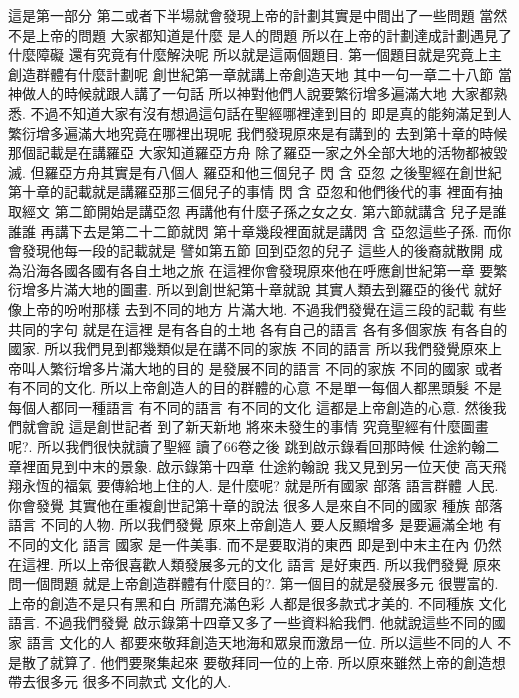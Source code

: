 \documentclass{book}
\begin{document}
這是第一部分 第二或者下半場就會發現上帝的計劃其實是中間出了一些問題 當然不是上帝的問題 大家都知道是什麼 是人的問題 所以在上帝的計劃達成計劃遇見了什麼障礙 還有究竟有什麼解決呢 所以就是這兩個題目.
第一個題目就是究竟上主創造群體有什麼計劃呢 創世紀第一章就講上帝創造天地 其中一句一章二十八節 當神做人的時候就跟人講了一句話 所以神對他們人說要繁衍增多遍滿大地 大家都熟悉.
不過不知道大家有沒有想過這句話在聖經哪裡達到目的 即是真的能夠滿足到人繁衍增多遍滿大地究竟在哪裡出現呢 我們發現原來是有講到的 去到第十章的時候那個記載是在講羅亞 大家知道羅亞方舟 除了羅亞一家之外全部大地的活物都被毀滅.
但羅亞方舟其實是有八個人 羅亞和他三個兒子 閃 含 亞忽 之後聖經在創世紀第十章的記載就是講羅亞那三個兒子的事情 閃 含 亞忽和他們後代的事 裡面有抽取經文 第二節開始是講亞忽 再講他有什麼子孫之女之女.
第六節就講含 兒子是誰誰誰 再講下去是第二十二節就閃 第十章幾段裡面就是講閃 含 亞忽這些子孫.
而你會發現他每一段的記載就是 譬如第五節 回到亞忽的兒子 這些人的後裔就散開 成為沿海各國各國有各自土地之旅 在這裡你會發現原來他在呼應創世紀第一章 要繁衍增多片滿大地的圖畫.
所以到創世紀第十章就說 其實人類去到羅亞的後代 就好像上帝的吩咐那樣 去到不同的地方 片滿大地.
不過我們發覺在這三段的記載 有些共同的字句 就是在這裡 是有各自的土地 各有自己的語言 各有多個家族 有各自的國家.
所以我們見到都幾類似是在講不同的家族 不同的語言 所以我們發覺原來上帝叫人繁衍增多片滿大地的目的 是發展不同的語言 不同的家族 不同的國家 或者有不同的文化.
所以上帝創造人的目的群體的心意 不是單一每個人都黑頭髮 不是每個人都同一種語言 有不同的語言 有不同的文化 這都是上帝創造的心意.
然後我們就會說 這是創世記者 到了新天新地 將來未發生的事情 究竟聖經有什麼圖畫呢?.
所以我們很快就讀了聖經 讀了66卷之後 跳到啟示錄看回那時候 仕途約翰二章裡面見到中末的景象.
啟示錄第十四章 仕途約翰說 我又見到另一位天使 高天飛翔永恆的福氣 要傳給地上住的人.
是什麼呢? 就是所有國家 部落 語言群體 人民.
你會發覺 其實他在重複創世記第十章的說法 很多人是來自不同的國家 種族 部落 語言 不同的人物.
所以我們發覺 原來上帝創造人 要人反顯增多 是要遍滿全地 有不同的文化 語言 國家 是一件美事.
而不是要取消的東西 即是到中末主在內 仍然在這裡.
所以上帝很喜歡人類發展多元的文化 語言 是好東西.
所以我們發覺 原來問一個問題 就是上帝創造群體有什麼目的?.
第一個目的就是發展多元 很豐富的.
上帝的創造不是只有黑和白 所謂充滿色彩 人都是很多款式才美的.
不同種族 文化 語言.
不過我們發覺 啟示錄第十四章又多了一些資料給我們.
他就說這些不同的國家 語言 文化的人 都要來敬拜創造天地海和眾泉而激昂一位.
所以這些不同的人 不是散了就算了.
他們要聚集起來 要敬拜同一位的上帝.
所以原來雖然上帝的創造想帶去很多元 很多不同款式 文化的人.
\end{document}
